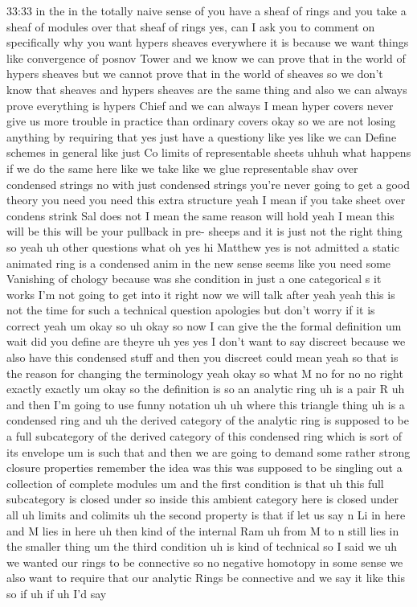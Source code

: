 \begin{unfinished}{33:33}
in the in the totally naive sense of you have a sheaf of rings and you take a sheaf of modules over that sheaf of rings yes, can I ask you to comment on specifically why you want hypers sheaves everywhere it is because we want things like convergence of posnov Tower and we know we can prove that in the world of hypers sheaves but we cannot prove that in the world of sheaves so we don't know that sheaves and hypers sheaves are the same thing and also we can always prove everything is hypers Chief and we can always I mean hyper covers never give us more trouble in practice than ordinary covers okay so we are not losing anything by requiring that yes just have a questiony like yes like we can Define schemes in general like just Co limits of representable sheets uhhuh what happens if we do the same here like we take like we glue representable shav over condensed strings no with just condensed strings you're never going to get a good theory you need you need this extra structure yeah I mean if you take sheet over condens strink Sal does not I mean the same reason will hold yeah I mean this will be this will be your pullback in pre- sheeps and it is just not the right thing so yeah uh other questions what oh yes hi Matthew yes is not admitted a static animated ring is a condensed anim in the new sense seems like you need some Vanishing of chology because was she condition in just a one categorical s it works I'm not going to get into it right now we will talk after yeah yeah this is not the time for such a technical question apologies but don't worry if it is correct yeah um okay so uh okay so now I can give the the formal definition um wait did you define are theyre uh yes yes I don't want to say discreet because we also have this condensed stuff and then you discreet could mean yeah so that is the reason for changing the terminology yeah okay so what M no for no no right exactly exactly um okay so the definition is so an analytic ring uh is a pair R uh and then I'm going to use funny notation uh uh where this triangle thing uh is a condensed ring and uh the derived category of the analytic ring is supposed to be a full subcategory of the derived category of this condensed ring which is sort of its envelope um is such that and then we are going to demand some rather strong closure properties remember the idea was this was supposed to be singling out a collection of complete modules um and the first condition is that uh this full subcategory is closed under so inside this ambient category here is closed under all uh limits and colimits uh the second property is that if let us say n Li in here and M lies in here uh then kind of the internal Ram uh from M to n still lies in the smaller thing um the third condition uh is kind of technical so I said we uh we wanted our rings to be connective so no negative homotopy in some sense we also want to require that our analytic Rings be connective and we say it like this so if uh if uh I'd say


\end{unfinished}
